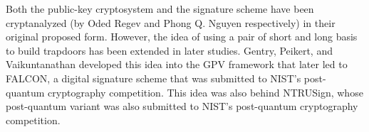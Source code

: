 \documentclass[letterpaper,12pt]{article}
\begin{document}
Both the public-key cryptosystem and the signature scheme have been cryptanalyzed (by Oded Regev and Phong Q. Nguyen respectively) in their original proposed form. However, the idea of using a pair of short and long basis to build trapdoors has been extended in later studies. Gentry, Peikert, and Vaikuntanathan developed this idea into the GPV framework that later led to FALCON, a digital signature scheme that was submitted to NIST's post-quantum cryptography competition. This idea was also behind NTRUSign, whose post-quantum variant was also submitted to NIST's post-quantum cryptography competition.
\end{document}
